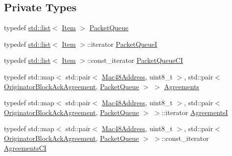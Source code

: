 \subsection*{Private Types}
\begin{DoxyCompactItemize}
\item 
typedef \hyperlink{openflow-interface_8h_afd9bcfa176617760671b67580f536fa7}{std\+::list}$<$ \hyperlink{structns3_1_1BlockAckManager_1_1Item}{Item} $>$ \hyperlink{classns3_1_1BlockAckManager_a19b26a2c6037c95267b6f1905feb07a5}{Packet\+Queue}
\item 
typedef \hyperlink{openflow-interface_8h_afd9bcfa176617760671b67580f536fa7}{std\+::list}$<$ \hyperlink{structns3_1_1BlockAckManager_1_1Item}{Item} $>$\+::iterator \hyperlink{classns3_1_1BlockAckManager_a2bb94802381e70535e8a7c892fd01d48}{Packet\+QueueI}
\item 
typedef \hyperlink{openflow-interface_8h_afd9bcfa176617760671b67580f536fa7}{std\+::list}$<$ \hyperlink{structns3_1_1BlockAckManager_1_1Item}{Item} $>$\+::const\+\_\+iterator \hyperlink{classns3_1_1BlockAckManager_a7d5306ccfcc49e44b7ffd190b2e190fa}{Packet\+Queue\+CI}
\item 
typedef std\+::map$<$ std\+::pair$<$ \hyperlink{classns3_1_1Mac48Address}{Mac48\+Address}, uint8\+\_\+t $>$, std\+::pair$<$ \hyperlink{classns3_1_1OriginatorBlockAckAgreement}{Originator\+Block\+Ack\+Agreement}, \hyperlink{classns3_1_1BlockAckManager_a19b26a2c6037c95267b6f1905feb07a5}{Packet\+Queue} $>$ $>$ \hyperlink{classns3_1_1BlockAckManager_aada7ad4c4011ce66e28aaa2bcb7aa915}{Agreements}
\item 
typedef std\+::map$<$ std\+::pair$<$ \hyperlink{classns3_1_1Mac48Address}{Mac48\+Address}, uint8\+\_\+t $>$, std\+::pair$<$ \hyperlink{classns3_1_1OriginatorBlockAckAgreement}{Originator\+Block\+Ack\+Agreement}, \hyperlink{classns3_1_1BlockAckManager_a19b26a2c6037c95267b6f1905feb07a5}{Packet\+Queue} $>$ $>$\+::iterator \hyperlink{classns3_1_1BlockAckManager_acbd1cf7c5f3487150955c3a4c9d04102}{AgreementsI}
\item 
typedef std\+::map$<$ std\+::pair$<$ \hyperlink{classns3_1_1Mac48Address}{Mac48\+Address}, uint8\+\_\+t $>$, std\+::pair$<$ \hyperlink{classns3_1_1OriginatorBlockAckAgreement}{Originator\+Block\+Ack\+Agreement}, \hyperlink{classns3_1_1BlockAckManager_a19b26a2c6037c95267b6f1905feb07a5}{Packet\+Queue} $>$ $>$\+::const\+\_\+iterator \hyperlink{classns3_1_1BlockAckManager_a69f7b0d583f5a24ddcfce51260a56dae}{Agreements\+CI}
\end{DoxyCompactItemize}
